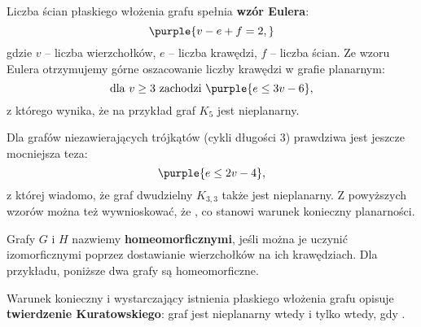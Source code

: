 Liczba ścian płaskiego włożenia grafu spełnia \textbf{wzór Eulera}:
$$\purple{v - e + f = 2,}$$
gdzie $v$ -- liczba wierzchołków, $e$ -- liczba krawędzi, $f$ -- liczba ścian. Ze wzoru Eulera otrzymujemy górne oszacowanie liczby krawędzi w grafie planarnym:
$$\text{dla } v \geq 3 \text{ zachodzi } \purple{e \leq 3v - 6},$$
z którego wynika, że na przykład graf $K_5$ jest nieplanarny.

Dla grafów niezawierających trójkątów (cykli długości 3) prawdziwa jest jeszcze mocniejsza teza:
$$\purple{e \leq 2v - 4},$$
z której wiadomo, że graf dwudzielny $K_{3, 3}$ także jest nieplanarny. Z powyższych wzorów można też wywnioskować, że , co stanowi warunek konieczny planarności.
\bigskip

Grafy $G$ i $H$ nazwiemy \textbf{homeomorficznymi}, jeśli można je uczynić izomorficznymi poprzez dostawianie wierzchołków na ich krawędziach. Dla przykładu, poniższe dwa grafy są homeomorficzne.
\begin{center}
\end{center}

Warunek konieczny i wystarczający istnienia płaskiego włożenia grafu opisuje \textbf{twierdzenie Kuratowskiego}: graf jest nieplanarny wtedy i tylko wtedy, gdy .

